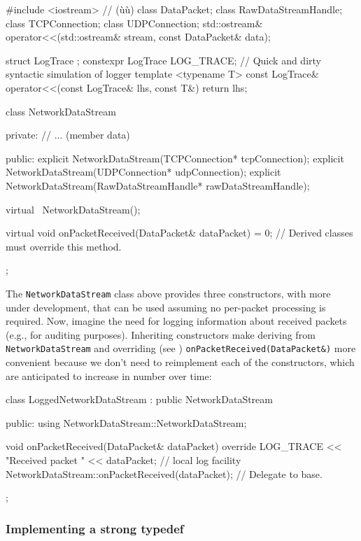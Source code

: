 \begin{emcppshiddenlisting}[emcppsbatch=e4]
#include <iostream>   // (ù{}ù)
class DataPacket;
class RawDataStreamHandle;
class TCPConnection;
class UDPConnection;
std::ostream& operator<<(std::ostream& stream, const DataPacket& data);

struct LogTrace {};
constexpr LogTrace LOG_TRACE; // Quick and dirty syntactic simulation of logger
template <typename T>
const LogTrace& operator<<(const LogTrace& lhs, const T&) { return lhs; }
\end{emcppshiddenlisting}
\begin{emcppslisting}[emcppsbatch=e4]
class NetworkDataStream
{
private:
    // ...                   (member data)

public:
    explicit NetworkDataStream(TCPConnection* tcpConnection);
    explicit NetworkDataStream(UDPConnection* udpConnection);
    explicit NetworkDataStream(RawDataStreamHandle* rawDataStreamHandle);

    virtual ~NetworkDataStream();

    virtual void onPacketReceived(DataPacket& dataPacket) = 0;
        // Derived classes must override this method.
};
\end{emcppslisting}

\noindent The \lstinline!NetworkDataStream! class above provides three constructors, with more
under development, that can be used assuming no per-packet processing is
required. Now, imagine the need for logging information about received
packets (e.g., for auditing purposes). Inheriting constructors make
deriving from \lstinline!NetworkDataStream! and overriding (see )
\lstinline!onPacketReceived(DataPacket&)! more convenient because we don't need to reimplement each of the constructors, which are
anticipated to increase in number over time:

\begin{emcppslisting}[emcppsbatch=e4]
class LoggedNetworkDataStream : public NetworkDataStream
{
public:
    using NetworkDataStream::NetworkDataStream;

    void onPacketReceived(DataPacket& dataPacket) override
    {
        LOG_TRACE << "Received packet " << dataPacket;    // local log facility
        NetworkDataStream::onPacketReceived(dataPacket);  // Delegate to base.
    }
};
\end{emcppslisting}


\subsubsection[Implementing a strong \lstinline!typedef!]{Implementing a strong {\SubsubsecCode typedef}}\label{implementing-a-strong-typedef}

